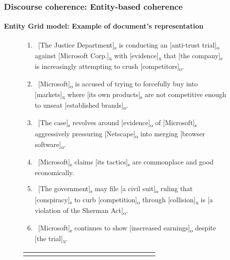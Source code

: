 \documentclass[xcolor=table]{beamer}
\begin{document}
\begin{frame}
	\frametitle{Discourse coherence: Entity-based coherence}
	\framesubtitle{Entity Grid model: Example of document's representation}
	
	\begin{figure}
		\centering\tiny\bfseries
		\begin{minipage}{.8\textwidth}
			\begin{enumerate}
				\item\ [The Justice Department]\textsubscript{s} is conducting an [anti-trust trial]\textsubscript{o} against [Microsoft Corp.]\textsubscript{x} with [evidence]\textsubscript{x} that [the company]\textsubscript{s} is increasingly attempting to crush [competitors]\textsubscript{o}.
				\item\ [Microsoft]\textsubscript{o} is accused of trying to forcefully buy into [markets]\textsubscript{x} where [its own products]\textsubscript{s} are not competitive enough to unseat [established brands]\textsubscript{o}.
				\item\ [The case]\textsubscript{s} revolves around [evidence]\textsubscript{o} of [Microsoft]\textsubscript{s} aggressively pressuring [Netscape]\textsubscript{o} into merging [browser software]\textsubscript{o}.
				\item\ [Microsoft]\textsubscript{s} claims [its tactics]\textsubscript{s} are commonplace and good economically.
				\item\ [The government]\textsubscript{s} may file [a civil suit]\textsubscript{o} ruling that [conspiracy]\textsubscript{s} to curb [competition]\textsubscript{o} through [collision]\textsubscript{x} is [a violation of the Sherman Act]\textsubscript{o}.
				\item\ [Microsoft]\textsubscript{s} continues to show [inscreased earnings]\textsubscript{o} despite [the trial]\textsubscript{x}.
			\end{enumerate}
		\end{minipage}
		
		\color{blue}
		\begin{tabular}{ccccccccccccccccc}
			& \rotatebox[origin=c]{90}{Department} & \rotatebox[origin=c]{90}{Trial} & \rotatebox[origin=c]{90}{Microsoft} &
			\rotatebox[origin=c]{90}{Evidence} & \rotatebox[origin=c]{90}{Competitors} & \rotatebox[origin=c]{90}{Markets} &
			\rotatebox[origin=c]{90}{Products} & \rotatebox[origin=c]{90}{Brands} & \rotatebox[origin=c]{90}{Case} &
			\rotatebox[origin=c]{90}{Netscape} & \rotatebox[origin=c]{90}{Software} & \rotatebox[origin=c]{90}{Tactics} &
			\rotatebox[origin=c]{90}{Government} & \rotatebox[origin=c]{90}{Suit} & \rotatebox[origin=c]{90}{Earnings} & \\
			

\end{tabular}
\end{figure}
\end{frame}
\end{document}

